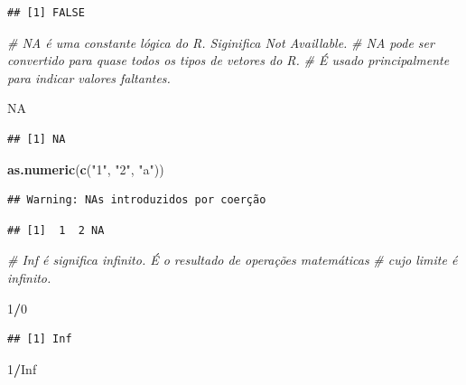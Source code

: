 \documentclass[
]{book}
\newenvironment{Shaded}{\begin{snugshade}}{\end{snugshade}}
\newcommand{\CommentTok}[1]{\textcolor[rgb]{0.56,0.35,0.01}{\textit{#1}}}
\newcommand{\DecValTok}[1]{\textcolor[rgb]{0.00,0.00,0.81}{#1}}
\newcommand{\KeywordTok}[1]{\textcolor[rgb]{0.13,0.29,0.53}{\textbf{#1}}}
\newcommand{\NormalTok}[1]{#1}
\newcommand{\OperatorTok}[1]{\textcolor[rgb]{0.81,0.36,0.00}{\textbf{#1}}}
\newcommand{\OtherTok}[1]{\textcolor[rgb]{0.56,0.35,0.01}{#1}}
\newcommand{\StringTok}[1]{\textcolor[rgb]{0.31,0.60,0.02}{#1}}
\begin{document}
\begin{verbatim}
## [1] FALSE
\end{verbatim}

\begin{Shaded}
\begin{Highlighting}[]
\CommentTok{\# NA é uma constante lógica do R. Siginifica Not Availlable. }
\CommentTok{\# NA pode ser convertido para quase todos os tipos de vetores do R. }
\CommentTok{\# É usado principalmente para indicar valores faltantes.}

\OtherTok{NA}
\end{Highlighting}
\end{Shaded}

\begin{verbatim}
## [1] NA
\end{verbatim}

\begin{Shaded}
\begin{Highlighting}[]
\KeywordTok{as.numeric}\NormalTok{(}\KeywordTok{c}\NormalTok{(}\StringTok{"1"}\NormalTok{, }\StringTok{"2"}\NormalTok{, }\StringTok{"a"}\NormalTok{))}
\end{Highlighting}
\end{Shaded}

\begin{verbatim}
## Warning: NAs introduzidos por coerção
\end{verbatim}

\begin{verbatim}
## [1]  1  2 NA
\end{verbatim}

\begin{Shaded}
\begin{Highlighting}[]
\CommentTok{\# Inf é significa infinito. É o resultado de operações matemáticas }
\CommentTok{\# cujo limite é infinito.}

\DecValTok{1}\OperatorTok{/}\DecValTok{0}
\end{Highlighting}
\end{Shaded}

\begin{verbatim}
## [1] Inf
\end{verbatim}

\begin{Shaded}
\begin{Highlighting}[]
\DecValTok{1}\OperatorTok{/}\OtherTok{Inf}
\end{Highlighting}
\end{Shaded}
\end{document}
